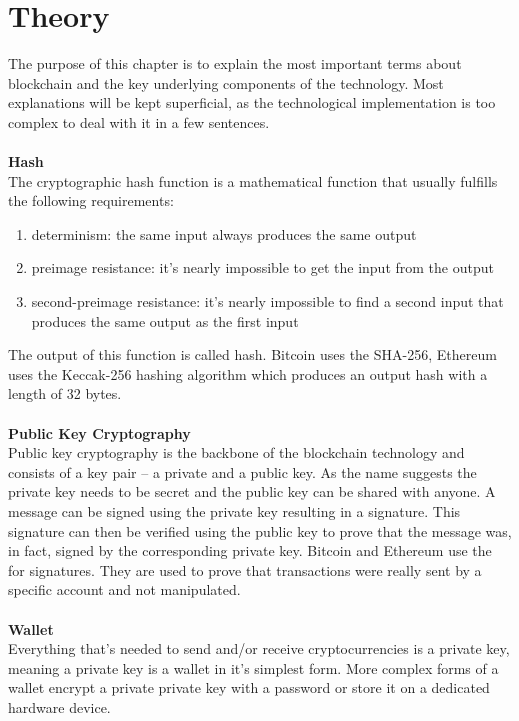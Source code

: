 \section{Theory}
The purpose of this chapter is to explain the most important terms about blockchain and the key underlying components of the technology. Most explanations will be kept superficial, as the technological implementation is too complex to deal with it in a few sentences.
\\\\

\textbf{Hash}\\
The cryptographic hash function is a mathematical function that usually fulfills the following requirements\cite{hash}:
\begin{enumerate}
    \item determinism: the same input always produces the same output
    \item preimage resistance: it’s nearly impossible to get the input from the output
    \item second-preimage resistance: it’s nearly impossible to find a second input that produces the same output as the first input
\end{enumerate}
The output of this function is called hash. Bitcoin uses the SHA-256\cite{bitcoin-whitepaper}, Ethereum uses the Keccak-256\cite{ethereum-yellow-paper} hashing algorithm which produces an output hash with a length of 32 bytes.
\\\\

\textbf{Public Key Cryptography}\\
Public key cryptography\cite{public-key-cryptography} is the backbone of the blockchain technology and consists of a key pair – a private and a public key. As the name suggests the private key needs to be secret and the public key can be shared with anyone. A message can be signed using the private key resulting in a signature. This signature can then be verified using the public key to prove that the message was, in fact, signed by the corresponding private key. Bitcoin and Ethereum use the  for signatures. They are used to prove that transactions were really sent by a specific account and not manipulated.
\\\\

\textbf{Wallet}\\
Everything that’s needed to send and/or receive cryptocurrencies is a private key\cite{bitcoin-whitepaper}, meaning a private key is a wallet in it’s simplest form. More complex forms of a wallet encrypt a private private key with a password or store it on a dedicated hardware device.
\\\\

